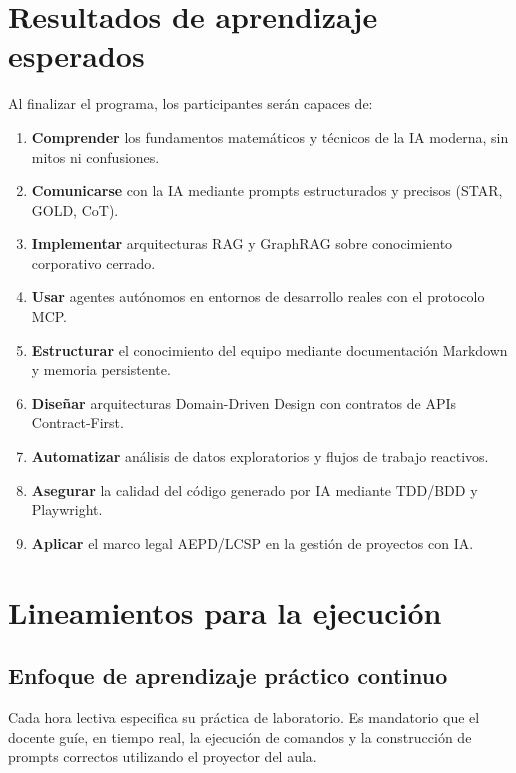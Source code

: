 \documentclass[11pt,a4paper]{article}
\begin{document}
\section{Resultados de aprendizaje esperados}

Al finalizar el programa, los participantes serán capaces de:

\begin{enumerate}
  \item \textbf{Comprender} los fundamentos matemáticos y técnicos de la IA moderna, sin mitos ni confusiones.
  \item \textbf{Comunicarse} con la IA mediante prompts estructurados y precisos (STAR, GOLD, CoT).
  \item \textbf{Implementar} arquitecturas RAG y GraphRAG sobre conocimiento corporativo cerrado.
  \item \textbf{Usar} agentes autónomos en entornos de desarrollo reales con el protocolo MCP.
  \item \textbf{Estructurar} el conocimiento del equipo mediante documentación Markdown y memoria persistente.
  \item \textbf{Diseñar} arquitecturas Domain-Driven Design con contratos de APIs Contract-First.
  \item \textbf{Automatizar} análisis de datos exploratorios y flujos de trabajo reactivos.
  \item \textbf{Asegurar} la calidad del código generado por IA mediante TDD/BDD y Playwright.
  \item \textbf{Aplicar} el marco legal AEPD/LCSP en la gestión de proyectos con IA.
\end{enumerate}

\section{Lineamientos para la ejecución}

\subsection{Enfoque de aprendizaje práctico continuo}

Cada hora lectiva especifica su práctica de laboratorio. Es mandatorio que el docente guíe, en tiempo real, la ejecución de comandos y la construcción de prompts correctos utilizando el proyector del aula.
\end{document}
